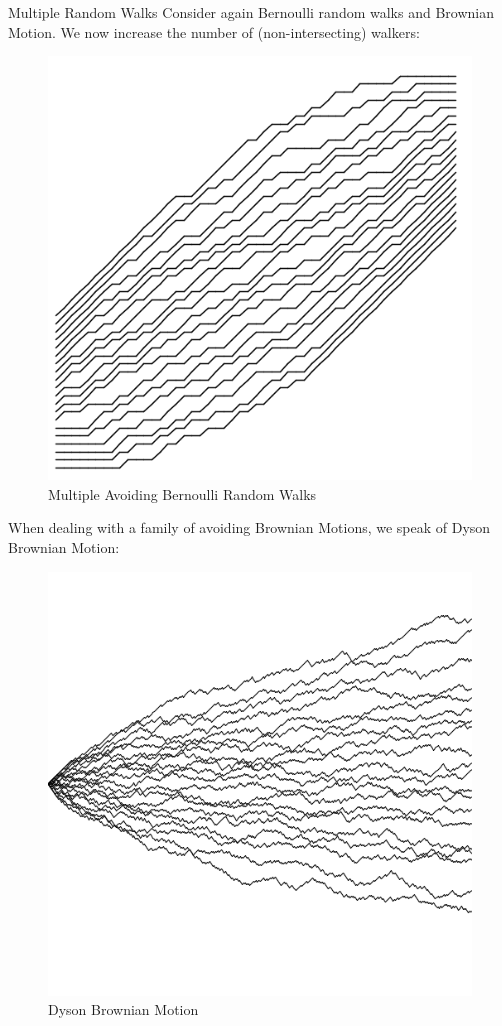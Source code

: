 \documentclass[9pt,t,dvipsnames]{beamer}
\begin{document}
\begin{frame}{Multiple Random Walks}
Consider again Bernoulli random walks and Brownian Motion. We now increase the number of (non-intersecting) walkers:
\begin{figure}
	\includegraphics[height=0.2\textheight]{graphics/MultipleBernoulli.png}
	\caption{Multiple Avoiding Bernoulli Random Walks}
\end{figure}
When dealing with a family of avoiding Brownian Motions, we speak of Dyson Brownian Motion:
\begin{figure}
\includegraphics[height=0.2\textheight]{graphics/DysonBrownian.png}
	\caption{Dyson Brownian Motion}
\end{figure}
\end{frame}
\end{document}

